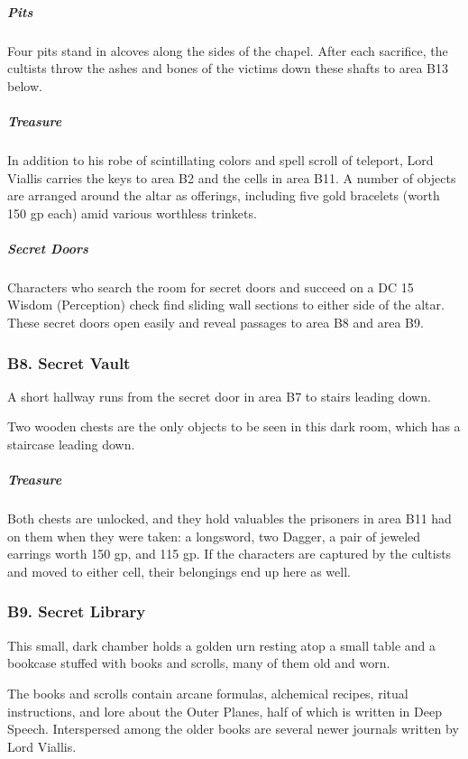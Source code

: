 \documentclass[10pt,a4paper,twoside,bg=print,twocolumn,openany,nodeprecatedcode]{dndbook}
\begin{document}
\subparagraph{Pits}
Four pits stand in alcoves along the sides of the chapel. After each sacrifice, the cultists throw the ashes and bones of the victims down these shafts to area B13 below.

\subparagraph{Treasure}
In addition to his robe of scintillating colors and spell scroll of teleport, Lord Viallis carries the keys to area B2 and the cells in area B11. A number of objects are arranged around the altar as offerings, including five gold bracelets (worth 150 gp each) amid various worthless trinkets.

\subparagraph{Secret Doors}
Characters who search the room for secret doors and succeed on a DC 15 Wisdom (Perception) check find sliding wall sections to either side of the altar. These secret doors open easily and reveal passages to area B8 and area B9.

\subsubsection{B8. Secret Vault}
A short hallway runs from the secret door in area B7 to stairs leading down.

\begin{DndReadAloud}{}
Two wooden chests are the only objects to be seen in this dark room, which has a staircase leading down.

\end{DndReadAloud}

\subparagraph{Treasure}
Both chests are unlocked, and they hold valuables the prisoners in area B11 had on them when they were taken: a longsword, two Dagger, a pair of jeweled earrings worth 150 gp, and 115 gp. If the characters are captured by the cultists and moved to either cell, their belongings end up here as well.

\subsubsection{B9. Secret Library}
\begin{DndReadAloud}{}
This small, dark chamber holds a golden urn resting atop a small table and a bookcase stuffed with books and scrolls, many of them old and worn.

\end{DndReadAloud}

The books and scrolls contain arcane formulas, alchemical recipes, ritual instructions, and lore about the Outer Planes, half of which is written in Deep Speech. Interspersed among the older books are several newer journals written by Lord Viallis.
\end{document}
